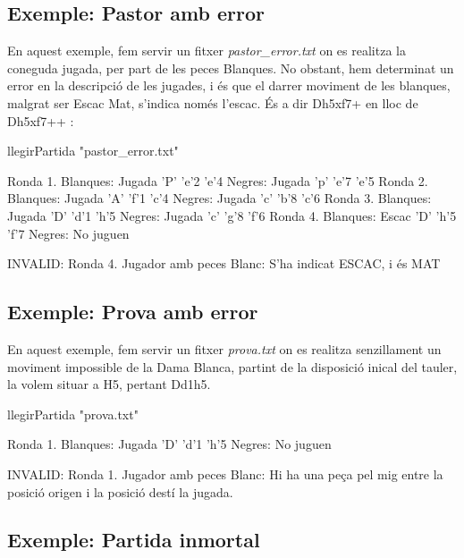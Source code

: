 \documentclass{article}
\begin{document}
\subsection{Exemple: Pastor \textbf{amb error}}
En aquest exemple, fem servir un fitxer \textit{pastor\_error.txt} on es realitza la coneguda jugada, per part de les peces Blanques. No obstant, hem determinat un error en la descripció de les jugades, i és que el darrer moviment de les blanques, malgrat ser Escac Mat, s'indica només l'escac. És a dir Dh5xf7+ en lloc de Dh5xf7++ :\\
\begin{tcolorbox}
llegirPartida "pastor\_error.txt"
\end{tcolorbox}
\begin{tcolorbox}
Ronda 1.
Blanques: Jugada 'P' 'e'2 'e'4
Negres:   Jugada 'p' 'e'7 'e'5
Ronda 2.
Blanques: Jugada 'A' 'f'1 'c'4
Negres:   Jugada 'c' 'b'8 'c'6
Ronda 3.
Blanques: Jugada 'D' 'd'1 'h'5
Negres:   Jugada 'c' 'g'8 'f'6
Ronda 4.
Blanques: Escac 'D' 'h'5 'f'7
Negres: No juguen

INVALID: Ronda 4. Jugador amb peces Blanc: S'ha indicat ESCAC, i és MAT
\end{tcolorbox}

\subsection{Exemple: Prova \textbf{amb error}}
En aquest exemple, fem servir un fitxer \textit{prova.txt} on es realitza senzillament un moviment impossible de la Dama Blanca, partint de la disposició inical del tauler, la volem situar a H5, pertant Dd1h5.
\begin{tcolorbox}
llegirPartida "prova.txt"
\end{tcolorbox}
\begin{tcolorbox}
Ronda 1.
Blanques: Jugada 'D' 'd'1 'h'5
Negres:  No juguen

INVALID: Ronda 1. Jugador amb peces Blanc: Hi ha una peça pel mig entre la posició origen i la posició destí la jugada.
\end{tcolorbox}
\newpage
\subsection{Exemple: Partida inmortal}
\end{document}
